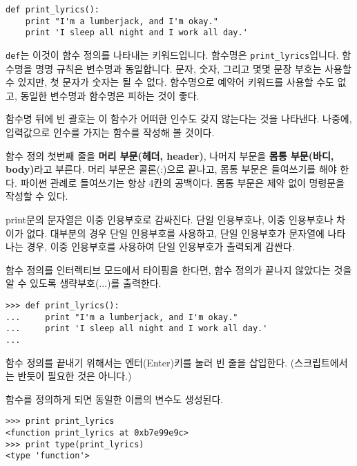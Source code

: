 \beforeverb
\begin{verbatim}
def print_lyrics():
    print "I'm a lumberjack, and I'm okay."
    print 'I sleep all night and I work all day.'
\end{verbatim}
\afterverb
%
{\tt def}는 이것이 함수 정의를 나타내는 키워드입니다. 함수명은 \verb"print_lyrics"입니다.
함수명을 명명 규칙은 변수명과 동일합니다. 문자, 숫자, 그리고 몇몇 문장 부호는 사용할 수 있지만,
첫 문자가 숫자는 될 수 없다. 함수명으로 예약어 키워드를 사용할 수도 없고, 동일한 변수명과 함수명은 피하는 것이 좋다.


함수명 뒤에 빈 괄호는 이 함수가 어떠한 인수도 갖지 않는다는 것을 나타낸다.
나중에, 입력값으로 인수를 가지는 함수를 작성해 볼 것이다.


함수 정의 첫번째 줄을 {\bf 머리 부문(헤더, header)}, 나머지 부문을 {\bf 몸통 부문(바디, body)}라고 부른다.
머리 부문은 콜론(:)으로 끝나고, 몸통 부문은 들여쓰기를 해야 한다.
파이썬 관례로 들여쓰기는 항상 4칸의 공백이다. 몸통 부문은 제약 없이 명령문을 작성할 수 있다.

print문의 문자열은 이중 인용부호로 감싸진다. 단일 인용부호나, 이중 인용부호나 차이가 없다.
대부분의 경우 단일 인용부호를 사용하고, 단일 인용부호가 문자열에 나타나는 경우, 이중 인용부호를 사용하여 단일 인용부호가 출력되게 감싼다.


함수 정의를 인터렉티브 모드에서 타이핑을 한다면, 함수 정의가 끝나지 않았다는 것을 알 수 있도록 생략부호(...)를 출력한다.

\beforeverb
\begin{verbatim}
>>> def print_lyrics():
...     print "I'm a lumberjack, and I'm okay."
...     print 'I sleep all night and I work all day.'
...
\end{verbatim}
\afterverb
%

함수 정의를 끝내기 위해서는 엔터(Enter)키를 눌러 빈 줄을 삽입한다. (스크립트에서는 반듯이 필요한 것은 아니다.) 

함수를 정의하게 되면 동일한 이름의 변수도 생성된다.

\beforeverb
\begin{verbatim}
>>> print print_lyrics
<function print_lyrics at 0xb7e99e9c>
>>> print type(print_lyrics)
<type 'function'>
\end{verbatim}
\afterverb
%

